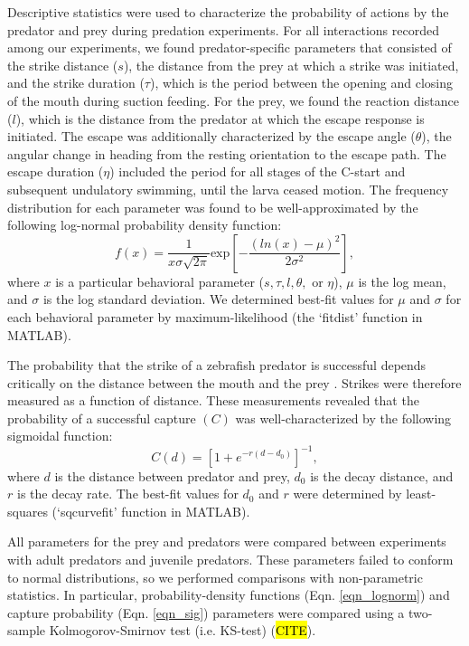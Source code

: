\documentclass[]{rsos}%
\begin{document}
Descriptive statistics were used to characterize the probability of actions by the predator and prey during predation experiments.
For all interactions recorded among our experiments, we found predator-specific parameters that consisted of the strike distance ($s$), the distance from the prey at which a strike was initiated, and the strike duration ($\tau$), which is the period between the opening and closing of the mouth during suction feeding. 
For the prey, we found the reaction distance ($l$), which is the distance from the predator at which the escape response is initiated.
The escape was additionally characterized by the escape angle ($\theta$), the angular change in heading from the resting orientation to the escape path.
The escape duration ($\eta$) included the period for all stages of the C-start and subsequent undulatory swimming, until the larva ceased motion.
The frequency distribution for each parameter was found to be well-approximated by the following log-normal probability density function:
%
\begin{equation}%
f(x) = \frac{1}{x\sigma \sqrt{2 \pi}} \text{exp} \left[ -{\frac{(ln(x)-\mu)^2}{2\sigma ^2}} \right],
\label{eqn_lognorm}
\end{equation}
%
where $x$ is a particular behavioral parameter ($s, \tau, l, \theta ,$ or $\eta$), $\mu$ is the log mean, and $\sigma$ is the log standard deviation. 
We determined best-fit values for $\mu$ and $\sigma$ for each behavioral parameter by maximum-likelihood (the `fitdist' function in MATLAB).

The probability that the strike of a zebrafish predator is successful depends critically on the distance between the mouth and the prey \cite{Stewart:2013bha}.
Strikes were therefore measured as a function of distance. 
These measurements revealed that the probability of a successful capture $(C)$ was well-characterized by the following sigmoidal function:
%
\begin{equation}%
C(d) = \left[ 1+e^{-r(d-d_0)} \right]^{-1},
\label{eqn_sig} 
\end{equation}
%
where $d$ is the distance between predator and prey, $d_0$ is the decay distance, and $r$ is the decay rate. 
The best-fit values for $d_0$ and $r$ were determined by least-squares (`sqcurvefit' function in MATLAB).

All parameters for the prey and predators were compared between experiments with adult predators and juvenile predators.
These parameters failed to conform to normal distributions, so we performed comparisons with non-parametric statistics. 
In particular, probability-density functions (Eqn. \ref{eqn_lognorm}) and capture probability (Eqn. \ref{eqn_sig}) parameters were compared using a two-sample Kolmogorov-Smirnov test (i.e. KS-test) (\hl{CITE}). 
\end{document}
